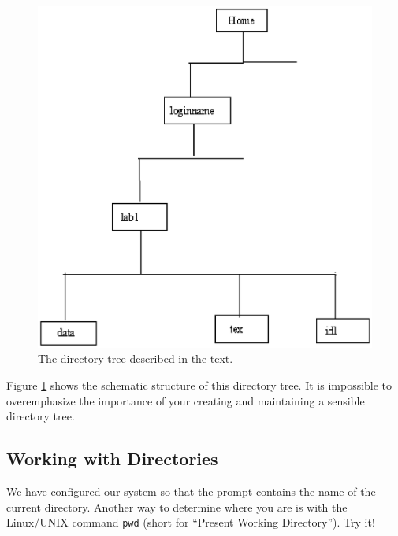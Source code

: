 \documentclass[psfig,preprint]{aastex}
\begin{document}
\begin{figure}[h!]
\begin{center}
\includegraphics[scale=0.4]{dirtree.ps}
\end{center}
\caption{The directory tree described in the text. 
\label{dirtree}}
\end{figure}

Figure \ref{dirtree} shows the schematic structure of this directory
tree. It is impossible to overemphasize the importance of your creating
and maintaining a sensible directory tree.

\subsection{Working with Directories}

We have configured our system so that the prompt contains the name of
the current directory. Another way to determine where you are is with
the Linux/UNIX command {\tt pwd} (short for ``Present Working
Directory''). Try it!
\end{document}
